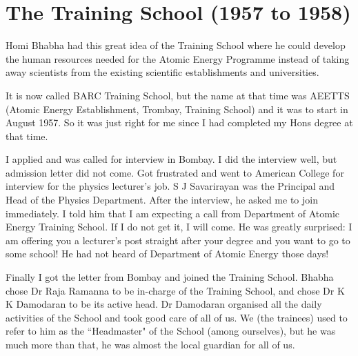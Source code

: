 \section*{The Training School (1957 to 1958)}

Homi Bhabha had this great idea of the Training School where he could develop the human resources needed for the Atomic Energy Programme instead of taking away scientists from the existing scientific establishments and universities.   

It is now called BARC Training School, but the name at that time was AEETTS (Atomic Energy Establishment, Trombay, Trai\-ning School) and it was to start in August 1957. So it was just right for me since I had completed my Hons degree at that time.

I applied and was called for interview in Bombay. I did the interview 
well, but admission letter did not come. Got frustrated and went to 
American College for interview for the physics lecturer's job. S J 
Savarirayan was the Principal and Head of the Physics Department. After 
the interview, he asked me to join immedi\-ately. I told him that I am 
expecting a call from Department of Atomic Energy Training School. If I 
do not get it, I will come. He was greatly surprised: I am offering you 
a lecturer's post straight after your degree and you want to go to some 
sch\-ool! He had not heard of Department of Atomic Energy those days! 

Finally I got the letter from Bombay and joined the Trai\-ning School. Bhabha chose Dr Raja Ramanna to be in-charge of the Training School, and chose Dr K K Damodaran to be its active head. Dr Damodaran organised all the daily activities of the School and took good care of all of us. We (the trainees) used to refer to him as the ``Headmaster" of the School (among ourselves), but he was much more than that, he was almost the local guardian for all of us.
 
